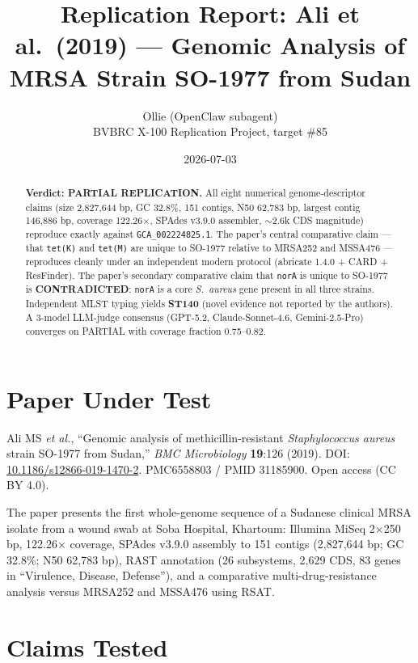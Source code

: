 \documentclass[11pt]{article}
\title{Replication Report: Ali et al.\ (2019) --- Genomic Analysis of MRSA Strain SO-1977 from Sudan}
\author{Ollie (OpenClaw subagent) \\ BVBRC X-100 Replication Project, target \#85}
\date{2026-07-03}
\begin{document}
\maketitle

\begin{abstract}
\noindent \textbf{Verdict: PARTIAL REPLICATION.} All eight numerical
genome-descriptor claims (size 2{,}827{,}644 bp, GC 32.8\%, 151 contigs,
N50 62{,}783 bp, largest contig 146{,}886 bp, coverage 122.26$\times$,
SPAdes v3.9.0 assembler, $\sim$2.6k CDS magnitude) reproduce exactly
against \texttt{GCA\_002224825.1}. The paper's central comparative
claim --- that \texttt{tet(K)} and \texttt{tet(M)} are unique to
SO-1977 relative to MRSA252 and MSSA476 --- reproduces cleanly under an
independent modern protocol (abricate 1.4.0 + CARD + ResFinder). The
paper's secondary comparative claim that \texttt{norA} is unique to
SO-1977 is \textbf{CONTRADICTED}: \texttt{norA} is a core \emph{S.\ aureus}
gene present in all three strains. Independent MLST typing yields
\textbf{ST140} (novel evidence not reported by the authors). A
3-model LLM-judge consensus (GPT-5.2, Claude-Sonnet-4.6, Gemini-2.5-Pro)
converges on PARTIAL with coverage fraction 0.75--0.82.
\end{abstract}

\section{Paper Under Test}

Ali MS \emph{et al.}, ``Genomic analysis of methicillin-resistant
\emph{Staphylococcus aureus} strain SO-1977 from Sudan,''
\emph{BMC Microbiology} \textbf{19}:126 (2019). DOI:
\href{https://doi.org/10.1186/s12866-019-1470-2}{10.1186/s12866-019-1470-2}.
PMC6558803 / PMID 31185900. Open access (CC BY 4.0).

The paper presents the first whole-genome sequence of a Sudanese
clinical MRSA isolate from a wound swab at Soba Hospital, Khartoum:
Illumina MiSeq 2$\times$250 bp, 122.26$\times$ coverage, SPAdes v3.9.0
assembly to 151 contigs (2{,}827{,}644 bp; GC 32.8\%; N50 62{,}783 bp),
RAST annotation (26 subsystems, 2{,}629 CDS, 83 genes in
``Virulence, Disease, Defense''), and a comparative multi-drug-resistance
analysis versus MRSA252 and MSSA476 using RSAT.

\section{Claims Tested}
\end{document}
